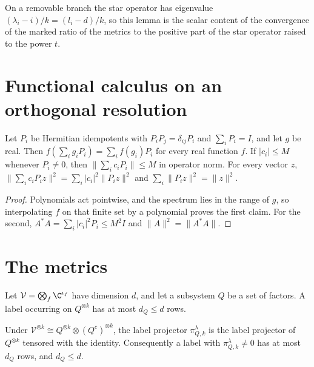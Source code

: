On a removable branch the star operator has eigenvalue $(\lambda_i-i)/k=(l_i-d)/k$,
so this lemma is the scalar content of the convergence of the marked ratio of
the metrics to the positive part of the star operator raised to the power $t$.

\section{Functional calculus on an orthogonal resolution}

\begin{lemma}
    \label{lem:orthogonal_resolution_cfc}
    \leanok
    Let $P_i$ be Hermitian idempotents with $P_iP_j=\delta_{ij}P_i$ and
    $\sum_iP_i=I$, and let $g$ be real. Then $f(\sum_ig_iP_i)=\sum_if(g_i)P_i$ for
    every real function $f$. If $|c_i|\le M$ whenever $P_i\ne0$, then
    $\|\sum_ic_iP_i\|\le M$ in operator norm. For every vector $z$,
    $\|\sum_ic_iP_iz\|^2=\sum_i|c_i|^2\|P_iz\|^2$ and $\sum_i\|P_iz\|^2=\|z\|^2$.
\end{lemma}

\begin{proof}\leanok
    Polynomials act pointwise, and the spectrum lies in the range of $g$, so
    interpolating $f$ on that finite set by a polynomial proves the first claim.
    For the second, $A^\ast A=\sum_i|c_i|^2P_i\le M^2I$ and
    $\|A\|^2=\|A^\ast A\|$.
\end{proof}

\section{The metrics}

Let $\mathcal V=\bigotimes_f\C^{\iota_f}$ have dimension $d$, and let a subsystem
$Q$ be a set of factors. A label occurring on $Q^{\otimes k}$ has at most $d_Q\le d$
rows.

\begin{lemma}
    \label{lem:subsystem_label_transport}
    \leanok
    Under $\mathcal V^{\otimes k}\cong Q^{\otimes k}\otimes(Q^c)^{\otimes k}$, the
    label projector $\pi^\lambda_{Q,k}$ is the label projector of $Q^{\otimes k}$
    tensored with the identity. Consequently a label with $\pi^\lambda_{Q,k}\ne0$
    has at most $d_Q$ rows, and $d_Q\le d$.
\end{lemma}

